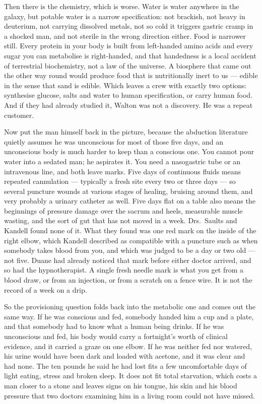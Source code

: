Then there is the chemistry, which is worse. Water is water anywhere in the galaxy, but potable
water is a narrow specification: not brackish, not heavy in deuterium, not carrying dissolved
metals, not so cold it triggers gastric cramp in a shocked man, and not sterile in the wrong
direction either. Food is narrower still. Every protein in your body is built from left-handed
amino acids and every sugar you can metabolise is right-handed, and that handedness is a local
accident of terrestrial biochemistry, not a law of the universe. A biosphere that came out the
other way round would produce food that is nutritionally inert to us --- edible in the sense
that sand is edible. Which leaves a crew with exactly two options: synthesise glucose, salts
and water to human specification, or carry human food.  And if they had already studied it, Walton
was not a discovery. He was a repeat customer.

Now put the man himself back in the picture, because the abduction literature quietly assumes
he was unconscious for most of those five days, and an unconscious body is much harder to keep
than a conscious one. You cannot pour water into a sedated man; he aspirates it. You need a
nasogastric tube or an intravenous line, and both leave marks. Five days of continuous fluids
means repeated cannulation --- typically a fresh site every two or three days --- so several
puncture wounds at various stages of healing, bruising around them, and very probably a urinary
catheter as well. Five days flat on a table also means the beginnings of pressure damage over
the sacrum and heels, measurable muscle wasting, and the sort of gut that has not moved in a
week. Drs.~Saults and Kandell found none of it. What they found was one red mark on the inside
of the right elbow, which Kandell described as compatible with a puncture such as when somebody
takes blood from you, and which was judged to be a day or two old --- not five. Duane had
already noticed that mark before either doctor arrived, and so had the hypnotherapist. A single
fresh needle mark is what you get from a blood draw, or from an injection, or from a scratch on
a fence wire. It is not the record of a week on a drip.

So the provisioning question folds back into the metabolic one and comes out the same way. If he
was conscious and fed, somebody handed him a cup and a plate, and that somebody had to know
what a human being drinks. If he was unconscious and fed, his body would carry a fortnight's
worth of clinical evidence, and it carried a graze on one elbow. If he was neither fed nor
watered, his urine would have been dark and loaded with acetone, and it was clear and had none.
The ten pounds he said he had lost fits a few uncomfortable days of light eating, stress and
broken sleep. It does not fit total starvation, which costs a man closer to a stone and leaves
signs on his tongue, his skin and his blood pressure that two doctors examining him in a
living room could not have missed.

